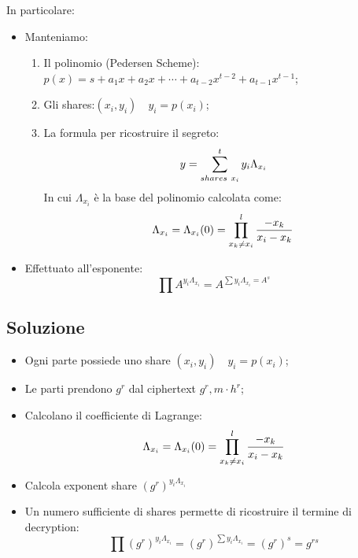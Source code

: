 \documentclass{book}
\begin{document}
In particolare:\begin{itemize}
	\item Manteniamo:\begin{enumerate}
		      \item Il polinomio (Pedersen Scheme): \(p(x)=s+a_{1}x+a_{2}x+\cdots+a_{t-2}x^{t-2}+a_{t-1}x^{t-1}\);
		      \item Gli shares:\((x_{i},y_{i})\quad y_{i}=p(x_{i})\);
		      \item La formula per ricostruire il segreto:
		            \begin{equation*}
			            \centering
			            y=\sum_{shares\ x_{i}}^{t}{y_{i}\Lambda_{x_{i}}}
		            \end{equation*}
		            In cui \(\Lambda_{x_{i}}\) è la base del polinomio calcolata come:
		            \begin{equation*}
			            \centering
			            \Lambda_{x_{i}}=\Lambda_{x_{i}}(0)=\prod_{x_{k}\neq x_{i}}^{l}{\frac{-x_{k}}{x_{i}-x_{k}}}
		            \end{equation*}
	      \end{enumerate}
	\item Effettuato all'esponente:\begin{equation*}
		      \prod{ A^{y_{i}\Lambda_{x_{i}}}}=A^{\sum{y_{i}\Lambda_{x_{i}}}=A^{s}}
	      \end{equation*}
\end{itemize}
\subsection{Soluzione}
\begin{itemize}
	\item Ogni parte possiede uno share \( (x_{i},y_{i})\quad y_{i}=p(x_{i})\);
	\item Le parti prendono \(g^{r}\) dal ciphertext \(g^{r},m\cdot h^{r}\);
	\item Calcolano il coefficiente di Lagrange:\begin{equation*}
		      \centering
		      \Lambda_{x_{i}}=\Lambda_{x_{i}}(0)=\prod_{x_{k}\neq x_{i}}^{l}{\frac{-x_{k}}{x_{i}-x_{k}}}
	      \end{equation*}
	\item Calcola exponent share \({(g^{r})}^{y_{i}\Lambda_{x_{i}}}\)
	\item Un numero sufficiente di shares permette di ricostruire il termine di decryption:\begin{equation*}
		      \prod{(g^{r})}^{y_{i}\Lambda_{x_{i}}}={(g^{r})}^{\sum{y_{i}\Lambda_{x_{i}}}}={(g^{r})}^{s}=g^{rs}
	      \end{equation*}
\end{itemize}
\end{document}
